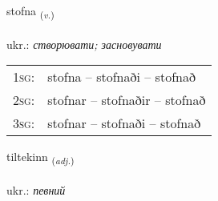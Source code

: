 \documentclass[frontgrid, backgrid]{flacards}\usepackage[]{graphicx}\usepackage[]{xcolor}
\begin{document}
\renewcommand{\blhead}{\vskip5pt {\small\bfseries\footnotesize Sagnorð | дієслово }}
\renewcommand{\bcfoot}{\vskip5pt \hspace{2pt}{\small\bfseries\footnotesize 1K}}


{stofna \small{\textsubscript{(\textit{v.})}} \\[1ex] %
\textphonetic{[stɔpna]} \\
ukr.: \emph{створювати; засновувати} \\  [2ex]
\renewcommand*{\arraystretch}{0.8}
\begin{tabular}{p{1cm}l}
\textsc{1sg}: & stofna -- stofnaði -- stofnað \\ 
\textsc{2sg}: & stofnar -- stofnaðir -- stofnað \\ 
\textsc{3sg}: & stofnar -- stofnaði -- stofnað \\ 
\end{tabular}
}

\renewcommand{\flhead}{\vskip5pt \fboxsep=0pt {\small\bfseries\footnotesize Lýsingarorð | прикметник}}
\renewcommand{\fcfoot}{\vskip5pt \fboxsep=0pt \hspace{2pt}{\small\bfseries\footnotesize 1K}}

\renewcommand{\blhead}{\vskip5pt {\small\bfseries\footnotesize Lýsingarorð | прикметник }}
\renewcommand{\bcfoot}{\vskip5pt \hspace{2pt}{\small\bfseries\footnotesize 1K}}


{tiltekinn \small{\textsubscript{(\textit{adj.})}} \\[1ex] %
\textphonetic{[tʰɪltʰɛcɪn]} \\
ukr.: \emph{певний} \\  [2ex]
\renewcommand*{\arraystretch}{0.8}
}
\end{document}
